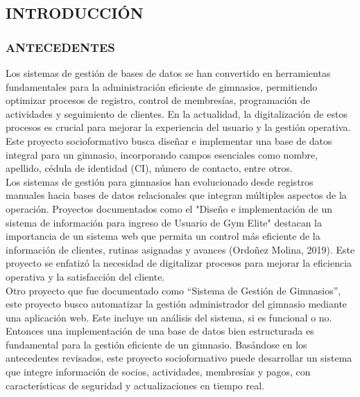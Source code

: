 \documentclass[12pt, letterpaper]{article}
\begin{document}
\subsection{INTRODUCCIÓN}
\subsubsection{ANTECEDENTES}
Los sistemas de gestión de bases de datos se han convertido en herramientas fundamentales para la administración eficiente de gimnasios, permitiendo optimizar procesos de registro, control de membresías, programación de actividades y seguimiento de clientes. En la actualidad, la digitalización de estos procesos es crucial para mejorar la experiencia del usuario y la gestión operativa. Este proyecto socioformativo busca diseñar e implementar una base de datos integral para un gimnasio, incorporando campos esenciales como nombre, apellido, cédula de identidad (CI), número de contacto, entre otros.\\
Los sistemas de gestión para gimnasios han evolucionado desde registros manuales hacia bases de datos relacionales que integran múltiples aspectos de la operación. Proyectos documentados como el "Diseño e implementación de un sistema de información para ingreso de Usuario de Gym Elite" destacan la importancia de un sistema web que permita un control más eficiente de la información de clientes, rutinas asignadas y avances (Ordoñez Molina, 2019). Este proyecto se enfatizó la necesidad de digitalizar procesos para mejorar la eficiencia operativa y la satisfacción del cliente.\\
Otro proyecto que fue documentado como “Sistema de Gestión de Gimnasios”, este proyecto busco automatizar la gestión administrador del gimnasio mediante una aplicación web. Este incluye un análisis del sistema, si es funcional o no.\\
Entonces una implementación de una base de datos bien estructurada es fundamental para la gestión eficiente de un gimnasio. Basándose en los antecedentes revisados, este proyecto socioformativo puede desarrollar un sistema que integre información de socios, actividades, membresías y pagos, con características de seguridad y actualizaciones en tiempo real.
\newpage
\end{document}

